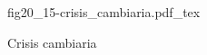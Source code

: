 \begin{figure}[h]
\centering
\def\svgwidth{0.5\textwidth}
{fig20_15-crisis_cambiaria.pdf_tex}
\caption{Crisis cambiaria}
\label{fig20_15-crisis_cambiaria}
\end{figure}